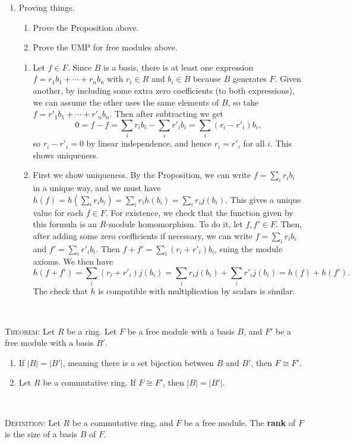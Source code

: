 \documentclass[12pt]{amsart}
\newcommand{\Bold}[1]{\contour{black}{#1}}
\newcommand{\solution}[1]{\ifthenelse {\equal{\displaysol}{1}} {\begin{framed}{\color{meretale}\noindent #1}\end{framed}} { \ }}
\newcommand\itemA{\stepcounter{enumi}\item[{\Bold{(\theenumi)}}]}
\newcommand\itema{\stepcounter{enumii}\item[{\Bold{(\theenumii)}}]}
\newcommand\itemb{\stepcounter{enumii}\item[(\theenumii)]}
\begin{document}
\begin{enumerate}
\itemA Proving things.
\begin{enumerate}
\itema Prove the Proposition above.
\itemb Prove the UMP for free modules above.
\end{enumerate}
\solution{
\begin{enumerate}
\itema Let $f\in F$. Since $B$ is a basis, there is at least one expression $f= r_1 b_1 + \cdots +r_n b_n$ with $r_i\in R$ and $b_i \in B$ because $B$ generates $F$. Given another, by including some extra zero coefficients (to both expressions), we can assume the other uses the same elements of $B$, so take $f=r'_1 b_1 + \cdots + r'_n b_n$. Then after subtracting we get
\[ 0 = f-f = \sum_i r_i b_i - \sum_i r'_i b_i = \sum_i (r_i-r'_i) b_i,\]
so $r_i-r'_i=0$ by linear independence, and hence $r_i=r'_i$ for all $i$. This shows uniqueness.
\itemb First we show uniqueness. By the Proposition, we can write $f= \sum_i r_i b_i$ in a unique way, and we must have $h(f) = h(\sum_i r_i b_i) = \sum_i r_i h(b_i) = \sum_i r_i j(b_i)$. This gives a unique value for each $f\in F$. For existence, we check that the function given by this formula is an $R$-module homomorphism. To do it, let $f,f'\in F$. Then, after adding some zero coefficients if necessary, we can write $f=\sum_i r_i b_i$ and $f'=\sum_i r'_i b_i$. Then $f+f' = \sum_i (r_i + r'_i) b_i$, suing the module axioms. We then have 
\[ h(f+ f') = \sum_i (r_i + r'_i) j(b_i) = \sum_i r_i j(b_i) + \sum_i r'_i j(b_i) = h(f) + h(f').\]
The check that $h$ is compatible with multiplication by scalars is similar.
\end{enumerate}
}



\end{enumerate}



\begin{framed}
\textsc{Theorem:} Let $R$ be a ring. Let $F$ be a free module with a basis $B$, and $F'$ be a free module with a basis $B'$.
\begin{enumerate}
\item If $|B| = |B'|$, meaning there is a set bijection between $B$ and $B'$, then $F\cong F'$.
\item Let $R$ be a commutative ring. If $F\cong F'$, then $|B|=|B'|$.
\end{enumerate}

\

\textsc{Definition:} Let $R$ be a commutative ring, and $F$ be a free module. The \textbf{rank} of $F$ is the size of a basis $B$ of $F$. 
\end{framed}
\end{document}
